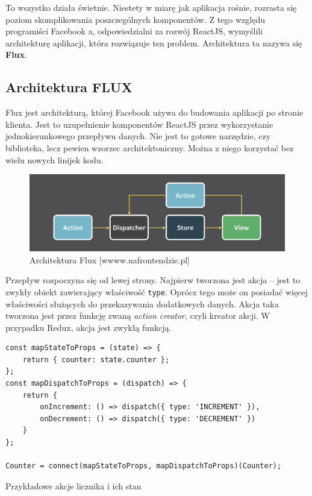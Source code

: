 To wszystko działa świetnie. Niestety w miarę jak aplikacja rośnie,
rozrasta się poziom skomplikowania poszczególnych komponentów.
Z tego względu programiści Facebook a, odpowiedzialni za rozwój ReactJS, wymyślili
architekturę aplikacji, która rozwiązuje ten problem.
Architektura ta nazywa się \textbf{Flux}.
~\cite{www_nafrontendzie}

\subsection{Architektura FLUX}

Flux jest architekturą, której Facebook używa do budowania aplikacji po stronie klienta.
Jest to uzupełnienie komponentów ReactJS przez wykorzystanie jednokierunkowego przepływu danych.
Nie jest to gotowe narzędzie, czy biblioteka, lecz pewien wzorzec architektoniczny.
Można z niego korzystać bez wielu nowych linijek kodu.

\begin{figure}
	\centering\includegraphics[width=.6\textwidth]{img/flux.png}
	\caption{Architektura Flux [wwww.nafrontendzie.pl]}\label{rys:flux}%
\end{figure}

Przepływ rozpoczyna się od lewej strony.
Najpierw tworzona jest akcja – jest to zwykły obiekt zawierający właściwość \texttt{type}.
Oprócz tego może on posiadać więcej właściwości służących do przekazywania dodatkowych danych.
Akcja taka tworzona jest przez funkcję zwaną \textit{action creator}, czyli kreator akcji.
W przypadku Redux, akcja jest zwykłą funkcją.

\begin{listing}
\begin{verbatim}
const mapStateToProps = (state) => {
    return { counter: state.counter };
};
const mapDispatchToProps = (dispatch) => {
    return {
        onIncrement: () => dispatch({ type: 'INCREMENT' }),
        onDecrement: () => dispatch({ type: 'DECREMENT' })
    }
};

Counter = connect(mapStateToProps, mapDispatchToProps)(Counter);
\end{verbatim}
\caption{Przykładowe akcje licznika i ich stan} \label{listing:licznik}
\end{listing}

